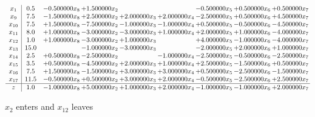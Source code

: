 \documentclass[10pt]{article}
\begin{document}
 \[\begin{array}{c| c c@{\hskip 2pt} c@{\hskip 2pt} c@{\hskip 2pt} c@{\hskip 2pt} c@{\hskip 2pt} c@{\hskip 2pt} c@{\hskip 2pt} }
 x_{1}   &  0.5 & -0.500000 x_{8} & + 1.500000 x_{2} &    &   & -0.500000 x_{5} & + 0.500000 x_{6} & + 0.500000 x_{7}\\
 x_{9}   &  7.5 & -1.500000 x_{8} & + 2.500000 x_{2} & + 2.000000 x_{3} & + 2.000000 x_{4} & -2.500000 x_{5} & + 0.500000 x_{6} & + 4.500000 x_{7}\\
 x_{10}   &  7.5 & + 1.500000 x_{8} & -7.500000 x_{2} & -1.000000 x_{3} & -1.000000 x_{4} & + 0.500000 x_{5} & -0.500000 x_{6} & -4.500000 x_{7}\\
 x_{11}   &  8.0 & + 1.000000 x_{8} & -3.000000 x_{2} & -3.000000 x_{3} & + 1.000000 x_{4} & + 2.000000 x_{5} & + 1.000000 x_{6} & -4.000000 x_{7}\\
 x_{12}   &  1.0 & + 1.000000 x_{8} & -3.000000 x_{2} & + 1.000000 x_{3} &   & + 4.000000 x_{5} & -1.000000 x_{6} & -4.000000 x_{7}\\
 x_{13}   &  15.0  &   & -1.000000 x_{2} & -3.000000 x_{3} &   & -2.000000 x_{5} & + 2.000000 x_{6} & + 1.000000 x_{7}\\
 x_{14}   &  2.5 & + 0.500000 x_{8} & -2.500000 x_{2} &   & -1.000000 x_{4} & -2.500000 x_{5} & -0.500000 x_{6} & -2.500000 x_{7}\\
 x_{15}   &  3.5 & + 0.500000 x_{8} & -4.500000 x_{2} & + 2.000000 x_{3} & + 1.000000 x_{4} & + 2.500000 x_{5} & -1.500000 x_{6} & + 0.500000 x_{7}\\
 x_{16}   &  7.5 & + 1.500000 x_{8} & -1.500000 x_{2} & + 3.000000 x_{3} & + 3.000000 x_{4} & + 0.500000 x_{5} & -2.500000 x_{6} & -1.500000 x_{7}\\
 x_{17}   &  11.5 & -0.500000 x_{8} & + 0.500000 x_{2} & + 3.000000 x_{3} & + 2.000000 x_{4} & -0.500000 x_{5} & -2.500000 x_{6} & + 2.500000 x_{7}\\
\hline
z    &  1.0 & -1.000000 x_{8} & + 5.000000 x_{2} & + 1.000000 x_{3} & + 2.000000 x_{4} & -1.000000 x_{5} & -1.000000 x_{6} & + 2.000000 x_{7}\\
\end{array}\]


 $ x_{2} $ enters and $ x_{12} $ leaves 
\end{document}
